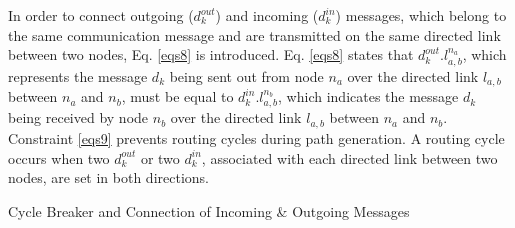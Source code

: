      In order to connect outgoing ($d_k^{out}$) and incoming ($d_k^{in}$) messages, which belong to the same communication message and are transmitted on the same directed link between two nodes, Eq. \eqref{eqs8} is introduced.
     Eq. \eqref{eqs8} states that $d_k^{out}.l_{a,b}^{n_a}$, which represents the message $d_k$ being sent out from node $n_a$ over the directed link $l_{a,b}$ between $n_a$ and $n_b$, must be equal to $d_k^{in}.l_{a,b}^{n_b}$, which indicates the message $d_k$ being received by node $n_b$ over the directed link $l_{a,b}$ between $n_a$ and $n_b$. 
     Constraint \eqref{eqs9} prevents routing cycles during path generation. A routing cycle occurs when two $d_k^{out}$ or two $d_k^{in}$, associated with each directed link between two nodes, are set in both directions. 
      	\begin{algorithm}[b!]
        \SetAlgoLined
        \caption{Cycle Breaker and Connection of Incoming \& Outgoing Messages }
        \label{algorithm_cycleBreaker}
        \end{algorithm}

